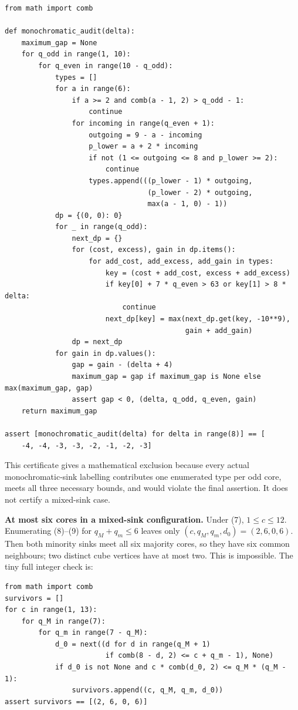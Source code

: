 \documentclass[11pt,a4paper]{article}
\begin{document}
\begin{Verbatim}[breaklines,breakanywhere,fontsize=\footnotesize]
from math import comb

def monochromatic_audit(delta):
    maximum_gap = None
    for q_odd in range(1, 10):
        for q_even in range(10 - q_odd):
            types = []
            for a in range(6):
                if a >= 2 and comb(a - 1, 2) > q_odd - 1:
                    continue
                for incoming in range(q_even + 1):
                    outgoing = 9 - a - incoming
                    p_lower = a + 2 * incoming
                    if not (1 <= outgoing <= 8 and p_lower >= 2):
                        continue
                    types.append(((p_lower - 1) * outgoing,
                                  (p_lower - 2) * outgoing,
                                  max(a - 1, 0) - 1))
            dp = {(0, 0): 0}
            for _ in range(q_odd):
                next_dp = {}
                for (cost, excess), gain in dp.items():
                    for add_cost, add_excess, add_gain in types:
                        key = (cost + add_cost, excess + add_excess)
                        if key[0] + 7 * q_even > 63 or key[1] > 8 * delta:
                            continue
                        next_dp[key] = max(next_dp.get(key, -10**9),
                                           gain + add_gain)
                dp = next_dp
            for gain in dp.values():
                gap = gain - (delta + 4)
                maximum_gap = gap if maximum_gap is None else max(maximum_gap, gap)
                assert gap < 0, (delta, q_odd, q_even, gain)
    return maximum_gap

assert [monochromatic_audit(delta) for delta in range(8)] == [
    -4, -4, -3, -3, -2, -1, -2, -3]
\end{Verbatim}

This certificate gives a mathematical exclusion because every actual monochromatic-sink labelling contributes one enumerated type per odd core, meets all three necessary bounds, and would violate the final assertion. It does not certify a mixed-sink case.

\textbf{At most six cores in a mixed-sink configuration.} Under (7), \(1\le c\le12\). Enumerating (8)--(9) for \(q_M+q_m\le6\) leaves only \((c,q_M,q_m,d_0)=(2,6,0,6)\). Then both minority sinks meet all six majority cores, so they have six common neighbours; two distinct cube vertices have at most two. This is impossible. The tiny full integer check is:

\begin{Verbatim}[breaklines,breakanywhere,fontsize=\footnotesize]
from math import comb
survivors = []
for c in range(1, 13):
    for q_M in range(7):
        for q_m in range(7 - q_M):
            d_0 = next((d for d in range(q_M + 1)
                        if comb(8 - d, 2) <= c + q_m - 1), None)
            if d_0 is not None and c * comb(d_0, 2) <= q_M * (q_M - 1):
                survivors.append((c, q_M, q_m, d_0))
assert survivors == [(2, 6, 0, 6)]
\end{Verbatim}
\end{document}
